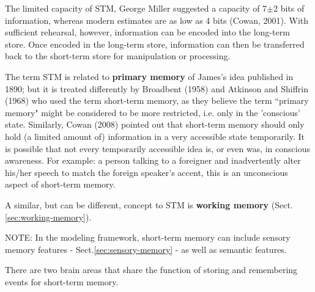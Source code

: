 The limited capacity of STM, George Miller suggested a capacity of 7$\pm$2 bits
of information, whereas modern estimates are as low as 4 bits (Cowan, 2001).
With sufficient rehearsal, however, information can be encoded into the
long-term store. Once encoded in the long-term store, information can then be
transferred back to the short-term store for manipulation or processing.




The term STM is related to {\bf primary memory} of James's idea published in
1890; but it is treated differently by Broadbent (1958) and Atkinson and
Shiffrin (1968) who used the term short-term memory, as they believe the term
``primary memory" might be considered to be more restricted, i.e. only in the
'conscious' state. Similarly, Cowan (2008) pointed out that short-term memory
should only hold (a limited amount of) information in a very accessible state
temporarily.  It is possible that not every temporarily accessible idea is, or
even was, in conscious awareness. For example: a person talking to a foreigner
and inadvertently alter his/her speech to match the foreign speaker's accent,
this is an unconscious aspect of short-term memory.

A similar, but can be different, concept to STM is {\bf working memory}
(Sect.\ref{sec:working-memory}).

\begin{mdframed}
NOTE: In the modeling framework, short-term memory can include sensory memory
 features - Sect.\ref{sec:sensory-memory} - as well as semantic features.

\end{mdframed} 
%   
% 
% 


There are two brain areas that share the function of storing and remembering
events for short-term memory. 

